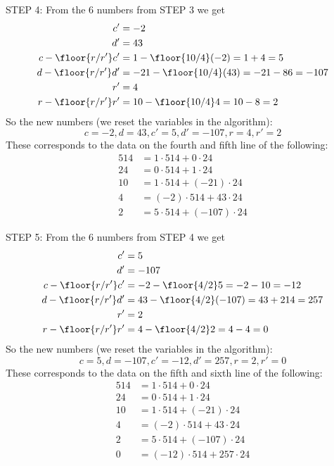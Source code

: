 STEP 4: From the 6 numbers from STEP 3 we get
\begin{align*}
 c' &= -2 \\
 d' &= 43 \\
 c - \floor{r/r'} c' &= 1 - \floor{10/4} (-2) = 1 + 4 = 5 \\
 d - \floor{r/r'}d'  &= -21 - \floor{10/4} (43) = -21 - 86 = -107 \\
 r' &= 4 \\ 
 r - \floor{r/r'}r' &= 10 - \floor{10/4} 4 = 10 - 8 = 2
\end{align*}
So the new numbers (we reset the variables in the algorithm):
\[
c = -2, d = 43, c' = 5, d'= -107, r=4, r'= 2
\]
These corresponds to the data on the fourth and fifth line of the following:
\begin{align*}
514 &= 1 \cdot 514 + 0 \cdot 24      \\
24  &= 0 \cdot 514 + 1 \cdot 24      \\
10  &= 1 \cdot 514 + (-21) \cdot 24  \\
4   &= (-2) \cdot 514 + 43 \cdot 24  \\
2   &= 5 \cdot 514 + (-107) \cdot 24 
\end{align*}

STEP 5: From the 6 numbers from STEP 4 we get
\begin{align*}
 c' &= 5 \\
 d' &= -107 \\
 c - \floor{r/r'} c' &= -2 - \floor{4/2} 5 = -2 - 10 = -12 \\
 d - \floor{r/r'} d'  &= 43 - \floor{4/2} (-107) = 43 + 214 = 257 \\
 r' &= 2 \\ 
 r - \floor{r/r'}r' &= 4 - \floor{4/2} 2 = 4 - 4 = 0
\end{align*}
So the new numbers (we reset the variables in the algorithm):
\[
c = 5, d = -107, c' = -12, d'= 257, r=2, r'= 0
\]
These corresponds to the data on the fifth and sixth line of the following:
\begin{align*}
514 &= 1 \cdot 514 + 0 \cdot 24       \\
24  &= 0 \cdot 514 + 1 \cdot 24       \\
10  &= 1 \cdot 514 + (-21) \cdot 24   \\
4   &= (-2) \cdot 514 + 43 \cdot 24   \\
2   &= 5 \cdot 514 + (-107) \cdot 24  \\
0   &= (-12) \cdot 514 + 257 \cdot 24 
\end{align*}

